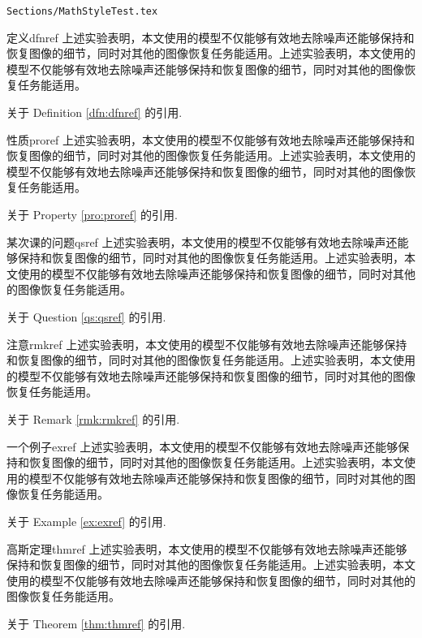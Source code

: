 
\begin{frame}{\texttt{Sections/MathStyleTest.tex}}

	\begin{beamerdefinition}{定义}{dfnref}
		上述实验表明，本文使用的模型不仅能够有效地去除噪声还能够保持和恢复图像的细节，同时对其他的图像恢复任务能适用。上述实验表明，本文使用的模型不仅能够有效地去除噪声还能够保持和恢复图像的细节，同时对其他的图像恢复任务能适用。
	\end{beamerdefinition}
	关于 Definition \ref{dfn:dfnref} 的引用.
	
	
	\begin{beamerproperty}{性质}{proref}
		上述实验表明，本文使用的模型不仅能够有效地去除噪声还能够保持和恢复图像的细节，同时对其他的图像恢复任务能适用。上述实验表明，本文使用的模型不仅能够有效地去除噪声还能够保持和恢复图像的细节，同时对其他的图像恢复任务能适用。
	\end{beamerproperty}
	关于 Property \ref{pro:proref} 的引用.
	
	\begin{beamerquestion}{某次课的问题}{qsref}
		上述实验表明，本文使用的模型不仅能够有效地去除噪声还能够保持和恢复图像的细节，同时对其他的图像恢复任务能适用。上述实验表明，本文使用的模型不仅能够有效地去除噪声还能够保持和恢复图像的细节，同时对其他的图像恢复任务能适用。
	\end{beamerquestion}
	关于 Question \ref{qs:qsref} 的引用.
	
	
	
	\begin{beamerremark}{注意}{rmkref}
		上述实验表明，本文使用的模型不仅能够有效地去除噪声还能够保持和恢复图像的细节，同时对其他的图像恢复任务能适用。上述实验表明，本文使用的模型不仅能够有效地去除噪声还能够保持和恢复图像的细节，同时对其他的图像恢复任务能适用。
	\end{beamerremark}
	关于 Remark \ref{rmk:rmkref} 的引用.
	
	
	
	\begin{beamerexample}{一个例子}{exref}
		上述实验表明，本文使用的模型不仅能够有效地去除噪声还能够保持和恢复图像的细节，同时对其他的图像恢复任务能适用。上述实验表明，本文使用的模型不仅能够有效地去除噪声还能够保持和恢复图像的细节，同时对其他的图像恢复任务能适用。
	\end{beamerexample}
	关于 Example \ref{ex:exref} 的引用.
	
	
	
	\begin{beamertheorem}{高斯定理}{thmref}
		上述实验表明，本文使用的模型不仅能够有效地去除噪声还能够保持和恢复图像的细节，同时对其他的图像恢复任务能适用。上述实验表明，本文使用的模型不仅能够有效地去除噪声还能够保持和恢复图像的细节，同时对其他的图像恢复任务能适用。
	\end{beamertheorem}
	关于 Theorem \ref{thm:thmref} 的引用.
	


\end{frame}
